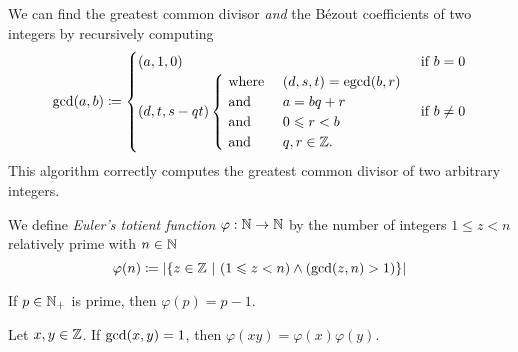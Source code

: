 \begin{algorithm}\label{alg:extdivision}
    We can find the greatest common divisor \emph{and} the B\'ezout coefficients
    of two integers by recursively computing
    \begin{equation*}
        \gcd\pn*{a, b} \defn 
        \begin{cases}
            (a, 1, 0)
                &\text{ if } b = 0\\
            (d, t, s - qt)
                \begin{cases}
                    \text{ where } &(d, s, t) = \text{egcd}\pn*{b, r}\\
                    \text{ and } &a = bq + r\\
                    \text{ and } &0 \leq r < b\\
                    \text{ and } &q, r \in \Z.
                \end{cases}
                &\text{ if } b \neq 0
        \end{cases}
    \end{equation*}
    This algorithm correctly computes the greatest common divisor of two arbitrary integers.
\end{algorithm}

\begin{definition}
    We define \emph{Euler's totient function} $\varphi: \mathbb{N} \to \mathbb{N}$ by the number of integers $1 \leq z < n$ relatively prime with $n \in \mathbb{N}$
    \begin{equation*}
        \varphi(n)
        \defn \cardinality*{\set*{z \in \Z \suchthat (1 \leq z < n) \meet \pn*{\gcd\pn*{z, n} > 1}}}
    \end{equation*}
\end{definition}

\begin{lemma}
    If $p \in \mathbb{N}_+$ is prime, then $\varphi(p) = p - 1$.
\end{lemma}

\begin{theorem}\label{thm:totient}
    Let $x, y \in \mathbb{Z}$. If $\gcd\pn*{x, y} = 1$, then $\varphi(xy) = \varphi(x)\varphi(y)$.
\end{theorem}

